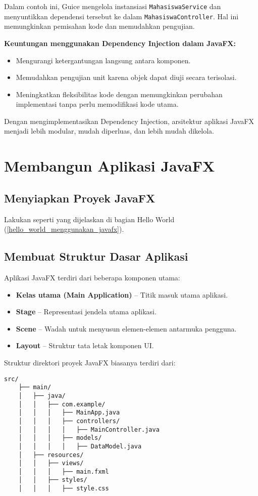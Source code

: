 Dalam contoh ini, Guice mengelola instansiasi \texttt{MahasiswaService} dan menyuntikkan dependensi tersebut ke dalam \texttt{MahasiswaController}. Hal ini memungkinkan pemisahan kode dan memudahkan pengujian.

\textbf{Keuntungan menggunakan Dependency Injection dalam JavaFX:}
\begin{itemize}
	\item Mengurangi ketergantungan langsung antara komponen.
	\item Memudahkan pengujian unit karena objek dapat diuji secara terisolasi.
	\item Meningkatkan fleksibilitas kode dengan memungkinkan perubahan implementasi tanpa perlu memodifikasi kode utama.
\end{itemize}

Dengan mengimplementasikan Dependency Injection, arsitektur aplikasi JavaFX menjadi lebih modular, mudah diperluas, dan lebih mudah dikelola.



\section{Membangun Aplikasi JavaFX}

\subsection{Menyiapkan Proyek JavaFX}

Lakukan seperti yang dijelaskan di bagian Hello World (\ref{hello_world_menggunakan_javafx}).

\subsection{Membuat Struktur Dasar Aplikasi}

Aplikasi JavaFX terdiri dari beberapa komponen utama:
\begin{itemize}
	\item \textbf{Kelas utama (Main Application)} – Titik masuk utama aplikasi.
	\item \textbf{Stage} – Representasi jendela utama aplikasi.
	\item \textbf{Scene} – Wadah untuk menyusun elemen-elemen antarmuka pengguna.
	\item \textbf{Layout} – Struktur tata letak komponen UI.
\end{itemize}

Struktur direktori proyek JavaFX biasanya terdiri dari:
\begin{lstlisting}[style=JavaStyle, caption=Struktur proyek JavaFX]
	src/
	├── main/
	│   ├── java/
	│   │   ├── com.example/
	│   │   │   ├── MainApp.java
	│   │   │   ├── controllers/
	│   │   │   │   ├── MainController.java
	│   │   │   ├── models/
	│   │   │   │   ├── DataModel.java
	│   ├── resources/
	│   │   ├── views/
	│   │   │   ├── main.fxml
	│   │   ├── styles/
	│   │   │   ├── style.css
\end{lstlisting}

